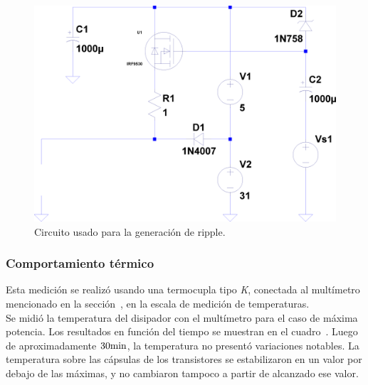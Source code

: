 \begin{figure}[H]
    \centering
    \includegraphics[width= 0.6 \textwidth]{./img/circuito/PSRR_circ.png}
    \caption{Circuito usado para la generación de ripple.}
    \label{fig:generador_ripple}
\end{figure}


\vfill


\clearpage


\subsubsection{Comportamiento térmico}

Esta medición se realizó usando una termocupla tipo \textit{K}, conectada al multímetro mencionado en la sección~, en la escala de medición de temperaturas. \\

Se midió la temperatura del disipador con el multímetro para el caso de máxima potencia. Los resultados en función del tiempo se muestran en el cuadro~. Luego de aproximadamente $ 30 \si[per-mode=symbol]{\minute} $, la temperatura no presentó variaciones notables. La temperatura sobre las cápsulas de los transistores se estabilizaron en un valor por debajo de las máximas, y no cambiaron tampoco a partir de alcanzado ese valor.



